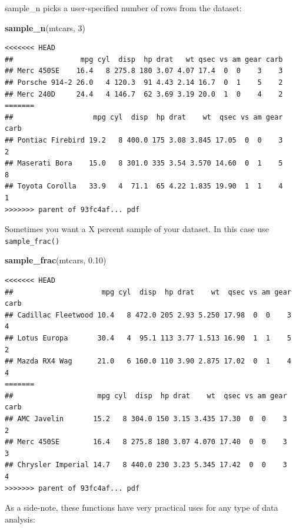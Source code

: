 \documentclass[]{book}
\newenvironment{Shaded}{\begin{snugshade}}{\end{snugshade}}
\newcommand{\DecValTok}[1]{\textcolor[rgb]{0.00,0.00,0.81}{#1}}
\newcommand{\FloatTok}[1]{\textcolor[rgb]{0.00,0.00,0.81}{#1}}
\newcommand{\KeywordTok}[1]{\textcolor[rgb]{0.13,0.29,0.53}{\textbf{#1}}}
\newcommand{\NormalTok}[1]{#1}
\theoremstyle{definition}
\theoremstyle{definition}
\theoremstyle{definition}
\theoremstyle{remark}
\begin{document}
\begin{Shaded}
\begin{Highlighting}[]
\begin{Shaded}
\begin{Highlighting}[]
\begin{Shaded}
\begin{Highlighting}[]
sample\_n picks a user-specified number of rows from the dataset:

\begin{Shaded}
\begin{Highlighting}[]
\KeywordTok{sample_n}\NormalTok{(mtcars, }\DecValTok{3}\NormalTok{)}
\end{Highlighting}
\end{Shaded}

\begin{verbatim}
<<<<<<< HEAD
##                mpg cyl  disp  hp drat   wt qsec vs am gear carb
## Merc 450SE    16.4   8 275.8 180 3.07 4.07 17.4  0  0    3    3
## Porsche 914-2 26.0   4 120.3  91 4.43 2.14 16.7  0  1    5    2
## Merc 240D     24.4   4 146.7  62 3.69 3.19 20.0  1  0    4    2
=======
##                   mpg cyl  disp  hp drat    wt  qsec vs am gear carb
## Pontiac Firebird 19.2   8 400.0 175 3.08 3.845 17.05  0  0    3    2
## Maserati Bora    15.0   8 301.0 335 3.54 3.570 14.60  0  1    5    8
## Toyota Corolla   33.9   4  71.1  65 4.22 1.835 19.90  1  1    4    1
>>>>>>> parent of 93fc4af... pdf
\end{verbatim}

Sometimes you want a X percent sample of your dataset. In this case use \texttt{sample\_frac()}

\begin{Shaded}
\begin{Highlighting}[]
\KeywordTok{sample_frac}\NormalTok{(mtcars, }\FloatTok{0.10}\NormalTok{)}
\end{Highlighting}
\end{Shaded}

\begin{verbatim}
<<<<<<< HEAD
##                     mpg cyl  disp  hp drat    wt  qsec vs am gear carb
## Cadillac Fleetwood 10.4   8 472.0 205 2.93 5.250 17.98  0  0    3    4
## Lotus Europa       30.4   4  95.1 113 3.77 1.513 16.90  1  1    5    2
## Mazda RX4 Wag      21.0   6 160.0 110 3.90 2.875 17.02  0  1    4    4
=======
##                    mpg cyl  disp  hp drat    wt  qsec vs am gear carb
## AMC Javelin       15.2   8 304.0 150 3.15 3.435 17.30  0  0    3    2
## Merc 450SE        16.4   8 275.8 180 3.07 4.070 17.40  0  0    3    3
## Chrysler Imperial 14.7   8 440.0 230 3.23 5.345 17.42  0  0    3    4
>>>>>>> parent of 93fc4af... pdf
\end{verbatim}

As a side-note, these functions have very practical uses for any type of data analysis:


\end{Highlighting}
\end{Shaded}
\end{Highlighting}
\end{Shaded}
\end{Highlighting}
\end{Shaded}
\end{document}
